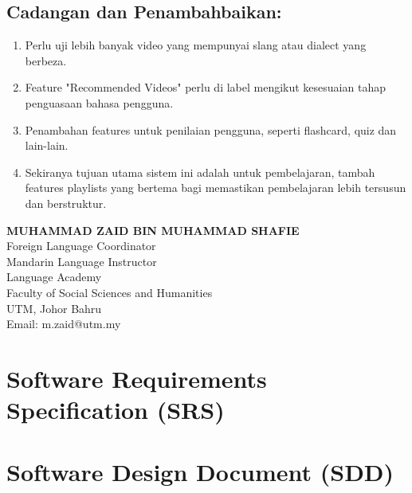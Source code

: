 \documentclass[oneside]{utmthesis}
\begin{document}
\section{Cadangan dan Penambahbaikan:}
\begin{enumerate}[label=\arabic*.]
    \item Perlu uji lebih banyak video yang mempunyai slang atau dialect yang berbeza.
    \item Feature "Recommended Videos" perlu di label mengikut kesesuaian tahap penguasaan bahasa pengguna.
    \item Penambahan features untuk penilaian pengguna, seperti flashcard, quiz dan lain-lain.
    \item Sekiranya tujuan utama sistem ini adalah untuk pembelajaran, tambah features playlists yang bertema bagi memastikan pembelajaran lebih tersusun dan berstruktur.
\end{enumerate}

\begin{flushleft}
    \textbf{MUHAMMAD ZAID BIN MUHAMMAD SHAFIE} \\
    Foreign Language Coordinator \\
    Mandarin Language Instructor \\
    Language Academy \\
    Faculty of Social Sciences and Humanities \\
    UTM, Johor Bahru \\
    Email: m.zaid@utm.my
\end{flushleft}



\chapter{Software Requirements Specification (SRS)}\label{app:srs}

\chapter{Software Design Document (SDD)}\label{app:sdd}

\hspace{\fill}


\endmatter
\end{document}
